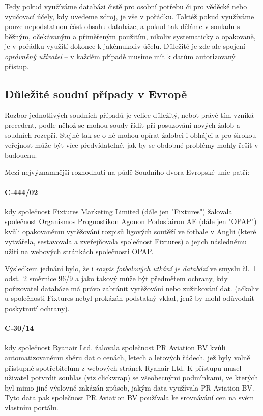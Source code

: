 \documentclass[thesis=B,czech]{FITthesis}[2012/06/26]
\begin{document}
Tedy pokud využíváme databázi čistě pro osobní potřebu či pro věděcké nebo vyučovací účely, kdy uvedeme zdroj, je vše v pořádku. Taktéž pokud využíváme pouze nepodstatnou část obsahu databáze, a pokud tak děláme v souladu s běžným, očekávaným a přiměřeným použitím, nikoliv systematicky a opakovaně, je v pořádku využití dokonce k jakémukoliv účelu. Důležité je zde ale spojení \textit{oprávněný uživatel} -- v každém případě musíme mít k datům autorizovaný přístup.

\subsection{Důležité soudní případy v Evropě}
Rozbor jednotlivých soudních případů je velice důležitý, neboť právě tím vzniká precedent, podle něhož se mohou soudy řídit při posuzování nových žalob a soudních rozepří. Stejně tak se o ně mohou opírat žalobci i obhájci a pro širokou veřejnost může být více předvídatelné, jak by se obdobné problémy mohly řešit v budoucnu.

Mezi nejvýznamnější rozhodnutí na půdě Soudního dvora Evropské unie patří:

\paragraph{C-444/02} kdy společnost Fixtures Marketing Limited (dále jen "Fixtures") žalovala společnost Organismos Prognostikon Agonon Podosfairou AE (dále jen "OPAP") kvůli opakovanému vytěžování rozpisů ligových soutěží ve fotbale v Anglii (které vytvářela, sestavovala a zveřejňovala společnost Fixtures) a jejich následnému užití na webových stránkách společnosti OPAP.\cite{C-444/02_1}

Výsledkem jednání bylo, že i \emph{rozpis fotbalových utkání je databází} ve smyslu čl.~1 odst.~2 směrnice 96/9 a jako takový může být předmětem ochrany, kdy pořizovatel databáze má právo zabránit vytěžování nebo zužitkování dat. (ačkoliv u společnosti Fixtures nebyl prokázán podstatný vklad, jenž by mohl odůvodnit poskytnutí ochrany).\cite{C-444/02_2}

\paragraph{C‑30/14} kdy společnost Ryanair Ltd. žalovala společnost PR Aviation BV kvůli automatizovanému sběru dat o cenách, letech a letových řádech, jež byly volně přístupné spotřebitelům z webových stránek Ryanair Ltd. K přístupu musel uživatel potvrdit souhlas (viz \hyperref[def:clickwrap]{clickwrap}) se všeobecnými podmínkami, ve kterých byl mimo jiné výslovně zakázán způsob, jakým data využívala PR Aviation BV. Tyto data pak společnost PR Aviation BV používala ke srovnávání cen na svém vlastním portálu.\cite{C-30/14}
\end{document}
